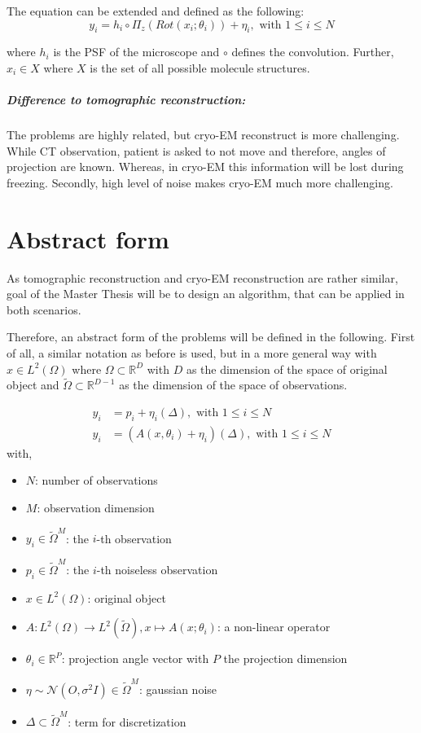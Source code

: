 The equation can be extended and defined as the following:
\begin{equation}
    \label{eq:cryoEmExtended}
    y_i = h_i \circ \Pi_z ( Rot (x_i; \theta_i)) + \eta_i, \text{ with } 1 \leq i \leq N
\end{equation}

where $h_i$ is the PSF of the microscope and $\circ$ defines the convolution.
Further, $x_i \in X$ where $X$ is the set of all possible molecule structures.


\subparagraph{Difference to tomographic reconstruction:}
The problems are highly related, but cryo-EM reconstruct is more challenging.
While CT observation, patient is asked to not move and therefore, angles of projection are known.
Whereas, in cryo-EM this information will be lost during freezing.
Secondly, high level of noise makes cryo-EM much more challenging.

\section{Abstract form}
\label{sec:abstract_form}
As tomographic reconstruction and cryo-EM reconstruction are rather similar, 
goal of the Master Thesis will be to design an algorithm, that can be applied in both scenarios.

Therefore, an abstract form of the problems will be defined in the following.
First of all, a similar notation as before is used, but in a more general way with
$x \in L^2(\Omega)$ where $\Omega \subset \mathbb{R}^D$ with $D$ as the dimension of the space of original object
and $\tilde{\Omega} \subset \mathbb{R}^{D-1}$ as the dimension of the space of observations.


\begin{equation}
    \begin{aligned}
        y_i &= p_i + \eta_i (\Delta), \text{ with } 1 \leq i \leq N \\
        y_i &= \left( A(x, \theta_i) + \eta_i \right) (\Delta), \text{ with } 1 \leq i \leq N 
    \end{aligned}
\end{equation}
with, 
\begin{itemize}
    \item $N$: number of observations
    \item $M$: observation dimension
    \item $y_i \in \tilde{\Omega}^M$: the $i$-th observation
    \item $p_i \in \tilde{\Omega}^M$: the $i$-th noiseless observation
    \item $x \in L^2(\Omega)$: original object
    \item $A: L^2(\Omega) \to L^2(\tilde{\Omega}), x \mapsto A(x; \theta_i)$: a non-linear operator 
    \item $\theta_i \in \mathbb{R}^P$: projection angle vector with $P$ the projection dimension
    \item $\eta \sim \mathcal{N}(O, \sigma^2 I) \in \tilde{\Omega}^M$: gaussian noise
    \item $\Delta \subset \tilde{\Omega}^{M}$: term for discretization
\end{itemize}

